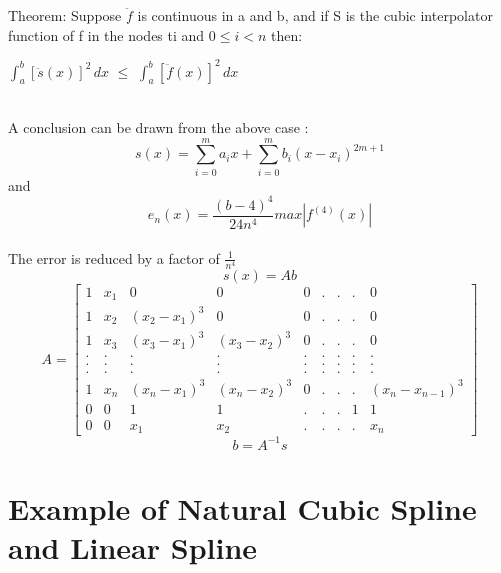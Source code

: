 \documentclass[12pt]{article}
\begin{document}
\begin{itemize}
Theorem: Suppose $\ddot{f}$ is continuous in a and b, and if S is the cubic interpolator function of f in the nodes ti and $0 \le i < n $ then: \\ 
\centerline{
\(\int_{a}^{b} [ \ddot{s}(x) ]^2 \,dx\) $\le$ \(\int_{a}^{b} [ \ddot{f}(x) ]^2 \,dx\)}\\
A conclusion can be drawn from the above case : \\
\begin{equation}
s(x) = \sum\limits_{i=0}^m a_i x + \sum\limits_{i=0}^m b_i (x-x_i) ^{2m+1}
\end{equation}
and 
\begin{equation}
e_n(x) = \frac{(b-4)^4}{24n^4} max|f^{(4)}(x)|
\end{equation} \\
The error is reduced by a factor of $\frac{1}{n^4}$ \\
\begin{equation}
s(x) = Ab
\end{equation}
\begin{equation}
A = \begin{bmatrix}
1 & x_1 & 0 & 0 & 0 &. & . & . & 0 \\
1 & x_2 & (x_2 - x_1)^3 & 0 & 0 & . & . & . & 0 \\
1 & x_3 & (x_3 - x_1)^3 & (x_3 - x_2)^3 & 0 & . & . & . & 0 \\
. & . & . & . & . & . & . & . & . \\
. & . & . & . & . & . & . & . & . \\
. & . & . & . & . & . & . & . & . \\
1 & x_n & (x_n - x_1)^3 & (x_n - x_2)^3 & 0 & . & . & . & (x_n - x_{n-1})^3 \\
0 & 0 & 1 & 1 & . & . & . & 1 & 1 \\
0 & 0 & x_1 & x_2 & . & . & . & . & x_n


\end{bmatrix}
\end{equation}
\begin{equation}
b = A^{-1}s
\end{equation}
\newpage
\section{Example of Natural Cubic Spline and Linear Spline}

\end{itemize}
\end{document}
